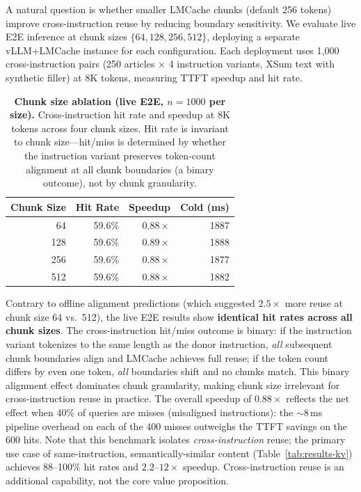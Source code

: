 \documentclass[10pt,twocolumn]{article}
\begin{document}
A natural question is whether smaller LMCache chunks (default 256 tokens)
improve cross-instruction reuse by reducing boundary sensitivity.
We evaluate live E2E inference at chunk sizes
$\{64, 128, 256, 512\}$, deploying a separate vLLM+LMCache instance for
each configuration. Each deployment uses 1,000 cross-instruction pairs
(250 articles $\times$ 4 instruction variants, XSum text with synthetic
filler) at 8K tokens, measuring TTFT speedup and hit rate.

\begin{table}[ht]
\centering
\small
\caption{\textbf{Chunk size ablation (live E2E, $n{=}1000$ per size).}
Cross-instruction hit rate and speedup at 8K tokens across four chunk
sizes. Hit rate is invariant to chunk size---hit/miss is determined by
whether the instruction variant preserves token-count alignment at all
chunk boundaries (a binary outcome), not by chunk granularity.}
\label{tab:chunk-size-ablation}
\begin{tabular}{rrrr}
\toprule
\textbf{Chunk Size} & \textbf{Hit Rate} & \textbf{Speedup} & \textbf{Cold (ms)} \\
\midrule
64   & 59.6\% & $0.88\times$ & 1887 \\
128  & 59.6\% & $0.89\times$ & 1888 \\
256  & 59.6\% & $0.88\times$ & 1877 \\
512  & 59.6\% & $0.88\times$ & 1882 \\
\bottomrule
\end{tabular}
\end{table}

Contrary to offline alignment predictions (which suggested $2.5\times$
more reuse at chunk size 64 vs.\ 512), the live E2E results show
\textbf{identical hit rates across all chunk sizes}. The cross-instruction
hit/miss outcome is binary: if the instruction variant tokenizes to the
same length as the donor instruction, \emph{all} subsequent chunk boundaries
align and LMCache achieves full reuse; if the token count differs by even
one token, \emph{all} boundaries shift and no chunks match.
This binary alignment effect dominates chunk granularity, making chunk
size irrelevant for cross-instruction reuse in practice. The overall
speedup of $0.88\times$ reflects the net effect when 40\% of queries
are misses (misaligned instructions): the ${\sim}8$\,ms pipeline
overhead on each of the 400 misses outweighs the TTFT savings on the
600 hits.  Note that this benchmark isolates
\emph{cross-instruction} reuse; the primary use case of
same-instruction, semantically-similar content
(Table~\ref{tab:results-kv}) achieves 88--100\% hit rates and
$2.2$--$12\times$ speedup. Cross-instruction reuse is an additional
capability, not the core value proposition.
\end{document}
